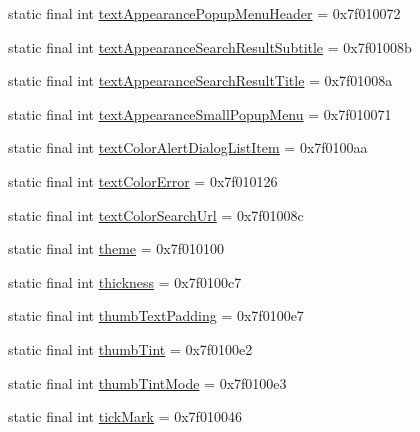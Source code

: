 \begin{CompactItemize}
\item 
static final int \hyperlink{classandroid_1_1support_1_1graphics_1_1drawable_1_1_r_1_1attr_09a48b76e400c8571acd1cbff0cf352c}{textAppearancePopupMenuHeader} = 0x7f010072
\item 
static final int \hyperlink{classandroid_1_1support_1_1graphics_1_1drawable_1_1_r_1_1attr_adda799cf997a14d25b063a98efe7db8}{textAppearanceSearchResultSubtitle} = 0x7f01008b
\item 
static final int \hyperlink{classandroid_1_1support_1_1graphics_1_1drawable_1_1_r_1_1attr_82a7b9b04f981edd905ead074b45af60}{textAppearanceSearchResultTitle} = 0x7f01008a
\item 
static final int \hyperlink{classandroid_1_1support_1_1graphics_1_1drawable_1_1_r_1_1attr_20c0c7f79c16be662b8956b2ad2e9c3d}{textAppearanceSmallPopupMenu} = 0x7f010071
\item 
static final int \hyperlink{classandroid_1_1support_1_1graphics_1_1drawable_1_1_r_1_1attr_730eac905545ddfa05134b8d71ebbd11}{textColorAlertDialogListItem} = 0x7f0100aa
\item 
static final int \hyperlink{classandroid_1_1support_1_1graphics_1_1drawable_1_1_r_1_1attr_4da7f8be6b6b9de102aaa3f10f64ca0c}{textColorError} = 0x7f010126
\item 
static final int \hyperlink{classandroid_1_1support_1_1graphics_1_1drawable_1_1_r_1_1attr_e6187b10079c781a4f6e5cba76978277}{textColorSearchUrl} = 0x7f01008c
\item 
static final int \hyperlink{classandroid_1_1support_1_1graphics_1_1drawable_1_1_r_1_1attr_849442e2d553960c21fa9be130b26974}{theme} = 0x7f010100
\item 
static final int \hyperlink{classandroid_1_1support_1_1graphics_1_1drawable_1_1_r_1_1attr_1b7d60d6df735f517e8a2da17d150b12}{thickness} = 0x7f0100c7
\item 
static final int \hyperlink{classandroid_1_1support_1_1graphics_1_1drawable_1_1_r_1_1attr_bb3875fe5314e704f6434288312c1d15}{thumbTextPadding} = 0x7f0100e7
\item 
static final int \hyperlink{classandroid_1_1support_1_1graphics_1_1drawable_1_1_r_1_1attr_7903a93cef018320465258849802e8b5}{thumbTint} = 0x7f0100e2
\item 
static final int \hyperlink{classandroid_1_1support_1_1graphics_1_1drawable_1_1_r_1_1attr_1aa9d308f452684be2218b5f042a6b88}{thumbTintMode} = 0x7f0100e3
\item 
static final int \hyperlink{classandroid_1_1support_1_1graphics_1_1drawable_1_1_r_1_1attr_f9493f05bc2cf87944d2ca020b89cc3e}{tickMark} = 0x7f010046

\end{CompactItemize}
